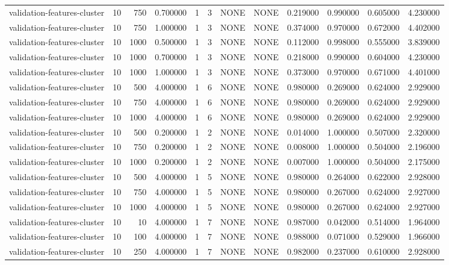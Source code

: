 \begin{tabular}{lrrrllllrrrr}
validation-features-cluster & 10 & 750 & 0.700000 & 1 & 3 & NONE & NONE & 0.219000 & 0.990000 & 0.605000 & 4.230000 \\
validation-features-cluster & 10 & 750 & 1.000000 & 1 & 3 & NONE & NONE & 0.374000 & 0.970000 & 0.672000 & 4.402000 \\
validation-features-cluster & 10 & 1000 & 0.500000 & 1 & 3 & NONE & NONE & 0.112000 & 0.998000 & 0.555000 & 3.839000 \\
validation-features-cluster & 10 & 1000 & 0.700000 & 1 & 3 & NONE & NONE & 0.218000 & 0.990000 & 0.604000 & 4.230000 \\
validation-features-cluster & 10 & 1000 & 1.000000 & 1 & 3 & NONE & NONE & 0.373000 & 0.970000 & 0.671000 & 4.401000 \\
validation-features-cluster & 10 & 500 & 4.000000 & 1 & 6 & NONE & NONE & 0.980000 & 0.269000 & 0.624000 & 2.929000 \\
validation-features-cluster & 10 & 750 & 4.000000 & 1 & 6 & NONE & NONE & 0.980000 & 0.269000 & 0.624000 & 2.929000 \\
validation-features-cluster & 10 & 1000 & 4.000000 & 1 & 6 & NONE & NONE & 0.980000 & 0.269000 & 0.624000 & 2.929000 \\
validation-features-cluster & 10 & 500 & 0.200000 & 1 & 2 & NONE & NONE & 0.014000 & 1.000000 & 0.507000 & 2.320000 \\
validation-features-cluster & 10 & 750 & 0.200000 & 1 & 2 & NONE & NONE & 0.008000 & 1.000000 & 0.504000 & 2.196000 \\
validation-features-cluster & 10 & 1000 & 0.200000 & 1 & 2 & NONE & NONE & 0.007000 & 1.000000 & 0.504000 & 2.175000 \\
validation-features-cluster & 10 & 500 & 4.000000 & 1 & 5 & NONE & NONE & 0.980000 & 0.264000 & 0.622000 & 2.928000 \\
validation-features-cluster & 10 & 750 & 4.000000 & 1 & 5 & NONE & NONE & 0.980000 & 0.267000 & 0.624000 & 2.927000 \\
validation-features-cluster & 10 & 1000 & 4.000000 & 1 & 5 & NONE & NONE & 0.980000 & 0.267000 & 0.624000 & 2.927000 \\
validation-features-cluster & 10 & 10 & 4.000000 & 1 & 7 & NONE & NONE & 0.987000 & 0.042000 & 0.514000 & 1.964000 \\
validation-features-cluster & 10 & 100 & 4.000000 & 1 & 7 & NONE & NONE & 0.988000 & 0.071000 & 0.529000 & 1.966000 \\
validation-features-cluster & 10 & 250 & 4.000000 & 1 & 7 & NONE & NONE & 0.982000 & 0.237000 & 0.610000 & 2.928000 \\

\end{tabular}
